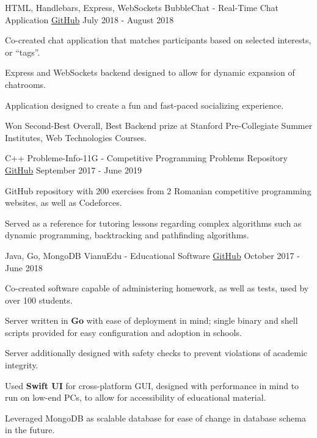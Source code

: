 
\begin{cventries}
  \cventry
    {HTML, Handlebars, Express, WebSockets}
    {BubbleChat - Real-Time Chat Application}
    {\href{https://github.com/StormFireFox1/BubbleChat}{GitHub}}
    {July 2018 - August 2018}
    {
      \begin{cvitems}
        \item {Co-created chat application that matches participants based on selected interests, or ``tags''.}
        \item {Express and WebSockets backend designed to allow for dynamic expansion of chatrooms.}
        \item {Application designed to create a fun and fast-paced socializing experience.}
        \item {Won Second-Best Overall, Best Backend prize at Stanford Pre-Collegiate Summer Institutes, Web Technologies Courses.}
      \end{cvitems}
    }
  \cventry
    {C++}
    {Probleme-Info-11G - Competitive Programming Problems Repository}
    {\href{https://github.com/StormFireFox1/Probleme-Info-11G}{GitHub}}
    {September 2017 - June 2019}
    {
      \begin{cvitems}
        \item {GitHub repository with 200 exercises from 2 Romanian competitive programming websites, as well as Codeforces.}
        \item {Served as a reference for tutoring lessons regarding complex algorithms such as dynamic programming, backtracking and pathfinding algorithms.}
      \end{cvitems}
    }
  \cventry
    {Java, Go, MongoDB}
    {VianuEdu - Educational Software}
    {\href{https://github.com/CNITV/VianuEdu}{GitHub}}
    {October 2017 - June 2018}
    {
      \begin{cvitems}
        \item {Co-created software capable of administering homework, as well as tests, used by over 100 students.}
        \item {Server written in \textbf{Go} with ease of deployment in mind; single binary and shell scripts provided for easy configuration and adoption in schools.}
        \item {Server additionally designed with safety checks to prevent violations of academic integrity.}
        \item {Used \textbf{Swift UI} for cross-platform GUI, designed with performance in mind to run on low-end PCs, to allow for accessibility of educational material.}
        \item {Leveraged MongoDB as scalable database for ease of change in database schema in the future.}
      \end{cvitems}
    }
\end{cventries}

